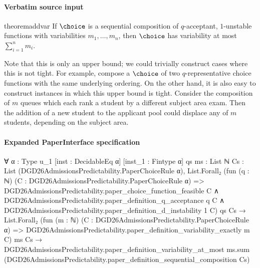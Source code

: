 \documentclass[10pt]{article}
\begin{document}
\paragraph{Verbatim source input}
\begin{ReviewVerbatim}
\begin{restatable}{theorem}{addvar}
\label{thm:additive-variability}
If $\choice$ is a sequential composition of $q$-acceptant, $1$-unstable functions with variabilities $m_1, \ldots, m_n$, then $\choice$ has variability at most $\sum_{i=1}^n m_i$.
\end{restatable}

Note that this is only an upper bound; we could trivially construct cases where this is not tight. For example, compose a $\choice$ of two $q$-representative choice functions with the same underlying ordering. On the other hand, it is also easy to construct instances in which this upper bound is tight. Consider the composition of $m$ queues which each rank a student by a different subject area exam. Then the addition of a new student to the applicant pool could displace any of $m$ students, depending on the subject area.
\end{ReviewVerbatim}



\paragraph{Expanded PaperInterface specification}
\begin{ReviewVerbatim}
∀ {α : Type u_1} [inst : DecidableEq α] [inst_1 : Fintype α] {qs ms : List ℕ}
  {Cs : List (DGD26AdmissionsPredictability.PaperChoiceRule α)},
  List.Forall₂
      (fun (q : ℕ) (C : DGD26AdmissionsPredictability.PaperChoiceRule α) =>
        DGD26AdmissionsPredictability.paper_choice_function_feasible C ∧
          DGD26AdmissionsPredictability.paper_definition_q_acceptance q C ∧
            DGD26AdmissionsPredictability.paper_definition_d_instability 1 C)
      qs Cs →
    List.Forall₂
        (fun (m : ℕ) (C : DGD26AdmissionsPredictability.PaperChoiceRule α) =>
          DGD26AdmissionsPredictability.paper_definition_variability_exactly m C)
        ms Cs →
      DGD26AdmissionsPredictability.paper_definition_variability_at_most ms.sum
        (DGD26AdmissionsPredictability.paper_definition_sequential_composition Cs)
\end{ReviewVerbatim}
\end{document}
